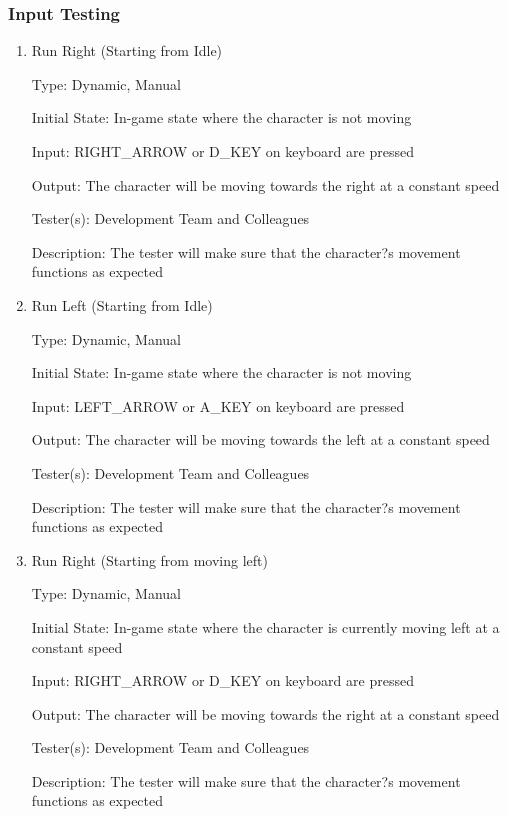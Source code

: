 \documentclass[12pt, titlepage]{article}
\begin{document}
\subsubsection{Input Testing}

\begin{enumerate}

\item{Run Right (Starting from Idle)\\}

Type: Dynamic, Manual

Initial State: In-game state where the character is not moving

Input: RIGHT\_ARROW or D\_KEY on keyboard are pressed 

Output: The character will be moving towards the right at a constant speed

Tester(s): Development Team and Colleagues

Description: The tester will make sure that the character?s movement functions as expected

\item{Run Left (Starting from Idle)\\}

Type: Dynamic, Manual

Initial State: In-game state where the character is not moving

Input: LEFT\_ARROW or A\_KEY on keyboard are pressed

Output: The character will be moving towards the left at a constant speed

Tester(s): Development Team and Colleagues

Description: The tester will make sure that the character?s movement functions as expected

\item{Run Right (Starting from moving left)\\}

Type: Dynamic, Manual

Initial State: In-game state where the character is currently moving left at a constant speed

Input: RIGHT\_ARROW or D\_KEY on keyboard are pressed

Output: The character will be moving towards the right at a constant speed

Tester(s): Development Team and Colleagues

Description: The tester will make sure that the character?s movement functions as expected


\end{enumerate}
\end{document}

